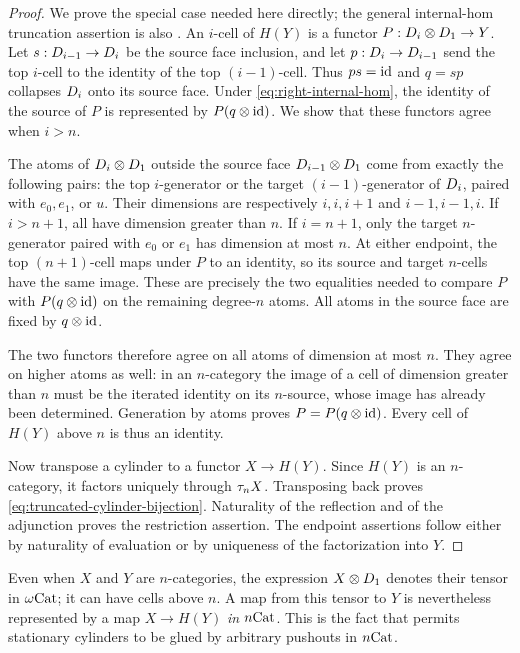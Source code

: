 \begin{proof}
We prove the special case needed here directly; the general
internal-hom truncation assertion is also
\cite[Proposition~A.29]{AraMaltsiniotis2020}.
An $i$-cell of $H(Y)$ is a functor
$P:D_{i}\otimes D_{1}\to Y$.  Let
$s:D_{i-1}\to D_{i}$ be the source face inclusion, and let
$p:D_{i}\to D_{i-1}$ send the top $i$-cell to the identity of the
top $(i-1)$-cell.  Thus $ps=\mathrm{id}$ and $q=sp$ collapses
$D_{i}$ onto its source face.  Under
\eqref{eq:right-internal-hom}, the identity of the source of $P$ is
represented by $P(q\otimes\mathrm{id})$.  We show that these functors agree
when $i>n$.

The atoms of $D_{i}\otimes D_{1}$ outside the source face
$D_{i-1}\otimes D_{1}$ come from exactly the following pairs:
the top $i$-generator or the target $(i-1)$-generator of $D_{i}$,
paired with $e_0,e_1$, or $u$.  Their dimensions are respectively
$i,i,i+1$ and $i-1,i-1,i$.  If $i>n+1$, all have dimension greater
than $n$.  If $i=n+1$, only the target $n$-generator paired with
$e_0$ or $e_1$ has dimension at most $n$.  At either endpoint, the
top $(n+1)$-cell maps under $P$ to an identity, so its source and
target $n$-cells have the same image.  These are precisely the two
equalities needed to compare $P$ with $P(q\otimes\mathrm{id})$ on the
remaining degree-$n$ atoms.  All atoms in the source face are fixed
by $q\otimes\mathrm{id}$.

The two functors therefore agree on all atoms of dimension at most
$n$.  They agree on higher atoms as well: in an $n$-category the
image of a cell of dimension greater than $n$ must be the iterated
identity on its $n$-source, whose image has already been determined.
Generation by atoms proves $P=P(q\otimes\mathrm{id})$.  Every cell of $H(Y)$
above $n$ is thus an identity.

Now transpose a cylinder to a functor $X\to H(Y)$.  Since $H(Y)$ is
an $n$-category, it factors uniquely through $\tau_n X$.  Transposing
back proves \eqref{eq:truncated-cylinder-bijection}.  Naturality of
the reflection and of the adjunction proves the restriction
assertion.  The endpoint assertions follow either by naturality of
evaluation or by uniqueness of the factorization into $Y$.
\end{proof}

\begin{remark}\label{rem:omega-tensor-at-finite-n}
Even when $X$ and $Y$ are $n$-categories, the expression
$X\otimes D_{1}$ denotes their tensor in $\omega\mathrm{Cat}$; it can have cells
above $n$.  A map from this tensor to $Y$ is nevertheless represented
by a map $X\to H(Y)$ \emph{in $n\mathrm{Cat}$}.  This is the fact that permits
stationary cylinders to be glued by arbitrary pushouts in $n\mathrm{Cat}$.
\end{remark}

